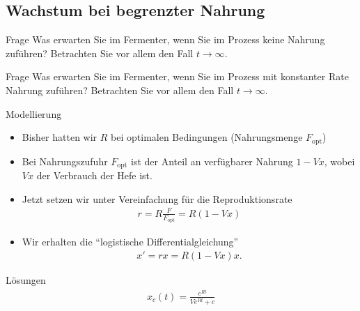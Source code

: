 \subsection{Wachstum bei begrenzter Nahrung}
\frame{\subtoc}

\begin{frame}
  \begin{exampleblock}{Frage}
    Was erwarten Sie im Fermenter, wenn Sie im Prozess keine Nahrung
    zuführen? Betrachten Sie vor allem den Fall $t\to\infty$.
  \end{exampleblock}
\end{frame}

\begin{frame}
  \begin{exampleblock}{Frage}
    Was erwarten Sie im Fermenter, wenn Sie im Prozess mit konstanter
    Rate Nahrung zuführen? Betrachten Sie vor allem den Fall
    $t\to\infty$.
  \end{exampleblock}
\end{frame}

\begin{frame}{Modellierung}
  \begin{itemize}
  \item Bisher hatten wir $R$ bei optimalen Bedingungen (Nahrungsmenge
    $F_{\text{opt}}$)
  \item Bei Nahrungszufuhr $F_{\text{opt}}$ ist der Anteil an verfügbarer Nahrung $1-Vx$, wobei $Vx$ der Verbrauch der Hefe ist.
  \item Jetzt setzen wir unter Vereinfachung für die Reproduktionsrate
    \begin{gather*}
      r = R \frac{F}{F_{\text{opt}}} = R (1-Vx)
    \end{gather*}
  \item Wir erhalten die ``logistische Differentialgleichung''
    \begin{gather*}
      x' = rx = R (1-Vx) x.
    \end{gather*}
  \end{itemize}
\end{frame}

\begin{frame}
  \begin{block}{Lösungen}
    \begin{gather*}
      x_c(t) = \frac{e^{Rt}}{V e^{Rt}+c}
    \end{gather*}
  \end{block}
\end{frame}

